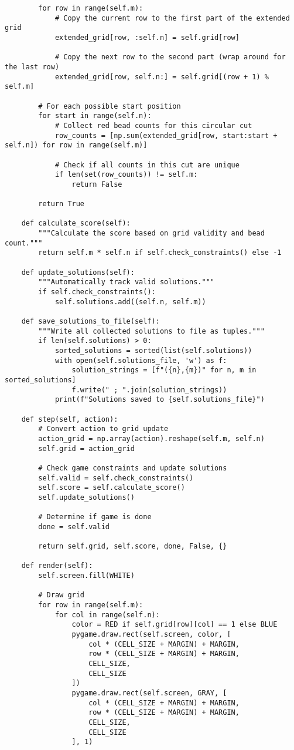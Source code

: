 \begin{lstlisting}
        for row in range(self.m):
            # Copy the current row to the first part of the extended grid
            extended_grid[row, :self.n] = self.grid[row]

            # Copy the next row to the second part (wrap around for the last row)
            extended_grid[row, self.n:] = self.grid[(row + 1) % self.m]

        # For each possible start position
        for start in range(self.n):
            # Collect red bead counts for this circular cut
            row_counts = [np.sum(extended_grid[row, start:start + self.n]) for row in range(self.m)]

            # Check if all counts in this cut are unique
            if len(set(row_counts)) != self.m:
                return False

        return True

    def calculate_score(self):
        """Calculate the score based on grid validity and bead count."""
        return self.m * self.n if self.check_constraints() else -1

    def update_solutions(self):
        """Automatically track valid solutions."""
        if self.check_constraints():
            self.solutions.add((self.n, self.m))

    def save_solutions_to_file(self):
        """Write all collected solutions to file as tuples."""
        if len(self.solutions) > 0:
            sorted_solutions = sorted(list(self.solutions))
            with open(self.solutions_file, 'w') as f:
                solution_strings = [f"({n},{m})" for n, m in sorted_solutions]
                f.write(" ; ".join(solution_strings))
            print(f"Solutions saved to {self.solutions_file}")

    def step(self, action):
        # Convert action to grid update
        action_grid = np.array(action).reshape(self.m, self.n)
        self.grid = action_grid

        # Check game constraints and update solutions
        self.valid = self.check_constraints()
        self.score = self.calculate_score()
        self.update_solutions()

        # Determine if game is done
        done = self.valid

        return self.grid, self.score, done, False, {}

    def render(self):
        self.screen.fill(WHITE)

        # Draw grid
        for row in range(self.m):
            for col in range(self.n):
                color = RED if self.grid[row][col] == 1 else BLUE
                pygame.draw.rect(self.screen, color, [
                    col * (CELL_SIZE + MARGIN) + MARGIN,
                    row * (CELL_SIZE + MARGIN) + MARGIN,
                    CELL_SIZE,
                    CELL_SIZE
                ])
                pygame.draw.rect(self.screen, GRAY, [
                    col * (CELL_SIZE + MARGIN) + MARGIN,
                    row * (CELL_SIZE + MARGIN) + MARGIN,
                    CELL_SIZE,
                    CELL_SIZE
                ], 1)


\end{lstlisting}
